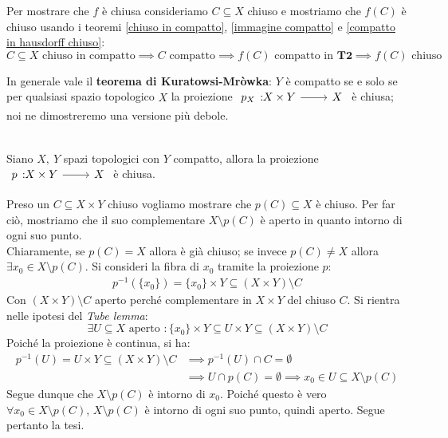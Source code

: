 \begin{demonstration}
	Per mostrare che $f$ è chiusa consideriamo $C\subseteq X$ chiuso e mostriamo che $f(C)$ è chiuso usando i teoremi \ref{chiuso in compatto}, \ref{immagine compatto} e \ref{compatto in hausdorff chiuso}:
		\begin{equation*}
				C\subseteq X \text{ chiuso in compatto} \implies C \text{ compatto} \implies f(C) \text{ compatto in }\mathbf{T2} \implies f(C) \text{ chiuso}
		\end{equation*}
\end{demonstration}
In generale vale il \textbf{teorema di Kuratowsi-Mròwka}: $Y$ è compatto se e solo se per qualsiasi spazio topologico $X$ la proiezione $\funz {p_X} {X\times Y} X$ è chiusa; noi ne dimostreremo una versione più debole.
\begin{theorema}~{}\\
Siano $X,\ Y$ spazi topologici con $Y$ compatto, allora la proiezione $\funz p {X\times Y} X$ è chiusa.
\end{theorema}
\begin{demonstration}
	Preso un $C\subseteq X\times Y$ chiuso vogliamo mostrare che $p(C)\subseteq X$ è chiuso. Per far ciò, mostriamo che il suo complementare $X\setminus p(C)$ è aperto in quanto intorno di ogni suo punto.\\
	Chiaramente, se $p(C)=X$ allora è già chiuso; se invece $p(C)\neq X$ allora $\exists x_0\in X\setminus p(C)$. Si consideri la fibra di $x_0$ tramite la proiezione $p$:
		\begin{gather*}
			p^{-1}(\{x_0\} )=\{x_0\}\times Y \subseteq (X\times Y)\setminus C
		\end{gather*}
	Con $(X\times Y)\setminus C$ aperto perché complementare in $X\times Y$ del chiuso $C$. Si rientra nelle ipotesi del \textit{Tube lemma}:
		\begin{equation*}
			\exists U\subseteq X \text{ aperto } \colon \{x_0\}\times Y \subseteq U\times Y\subseteq (X\times Y)\setminus C		\end{equation*}
	Poiché la proiezione è continua, si ha:
	\begin{equation*}
		\begin{array}{ll}
			p^{-1}(U)=U\times Y\subseteq (X\times Y)\setminus C &\implies p^{-1}(U)\cap C=\emptyset \\
			& \implies U\cap p(C)=\emptyset \implies x_0\in U\subseteq X\setminus p(C)
		\end{array}	
	\end{equation*}
Segue dunque che $X\setminus p\left(C\right)$ è intorno di $x_0$. Poiché questo è vero $\forall x_0\in X\setminus p\left(C\right)$, $X\setminus p\left(C\right)$ è intorno di ogni suo punto, quindi aperto. Segue pertanto la tesi.
\end{demonstration}